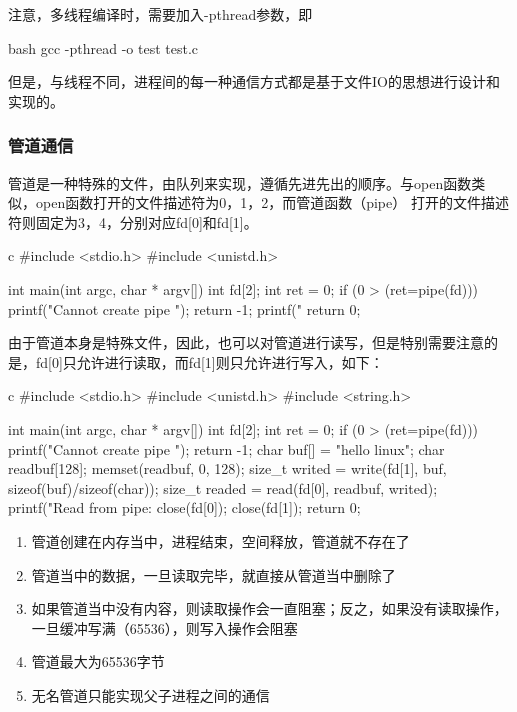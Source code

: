 注意，多线程编译时，需要加入-pthread参数，即
\begin{code-block}{bash}
gcc -pthread -o test test.c
\end{code-block}

但是，与线程不同，进程间的每一种通信方式都是基于文件IO的思想进行设计和实现的。

\subsubsection{管道通信}
管道是一种特殊的文件，由队列来实现，遵循先进先出的顺序。与open函数类似，open函数打开的文件描述符为0，1，2，而管道函数（pipe）
打开的文件描述符则固定为3，4，分别对应fd[0]和fd[1]。
\begin{code-block}{c}
#include <stdio.h>
#include <unistd.h>

int main(int argc, char * argv[])
{
        int fd[2];
        int ret = 0;
        if (0 > (ret=pipe(fd)))
        {
                printf("Cannot create pipe \n");
                return -1;
        }
        printf("%
        return 0;
}
\end{code-block}

由于管道本身是特殊文件，因此，也可以对管道进行读写，但是特别需要注意的是，fd[0]只允许进行读取，而fd[1]则只允许进行写入，如下：
\begin{code-block}{c}
#include <stdio.h>
#include <unistd.h>
#include <string.h>

int main(int argc, char * argv[])
{
        int fd[2];
        int ret = 0;
        if (0 > (ret=pipe(fd)))
        {
                printf("Cannot create pipe \n");
                return -1;
        }
        char buf[] = "hello linux";
        char readbuf[128];
        memset(readbuf, 0, 128);
        size_t writed = write(fd[1], buf, sizeof(buf)/sizeof(char));
        size_t readed = read(fd[0], readbuf, writed);
        printf("Read from pipe: %
        close(fd[0]);
        close(fd[1]);
        return 0;
}
\end{code-block}

\begin{enumerate}
  \item 管道创建在内存当中，进程结束，空间释放，管道就不存在了
  \item 管道当中的数据，一旦读取完毕，就直接从管道当中删除了
  \item 如果管道当中没有内容，则读取操作会一直阻塞；反之，如果没有读取操作，一旦缓冲写满（65536），则写入操作会阻塞
  \item 管道最大为65536字节
  \item 无名管道只能实现父子进程之间的通信
\end{enumerate}

